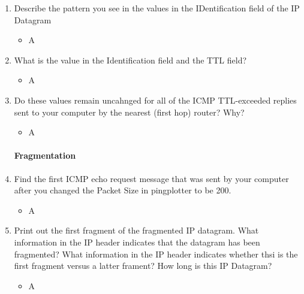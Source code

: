 \documentclass{article}
\begin{document}
\begin{enumerate}
      \item Describe the pattern you see in the values in the IDentification field of the IP Datagram 
          \begin{itemize}
            \item A
          \end{itemize}


      \item What is the value in the Identification field and the TTL field? 
          \begin{itemize}
            \item A
          \end{itemize}

      \item Do these values remain uncahnged for all of the ICMP TTL-exceeded replies sent to your computer by the nearest (first hop) router? Why? 
          \begin{itemize}
            \item A
          \end{itemize}

      \paragraph{Fragmentation}
      \item Find the first ICMP echo request message that was sent by your computer after you changed the Packet Size in pingplotter to be 200.
          \begin{itemize}
            \item A
          \end{itemize}

      \item Print out the first fragment of the fragmented IP datagram.  What information in the IP header indicates that the datagram has been fragmented?  What information in the IP header indicates whether thsi is the first fragment
      versus a latter frament?  How long is this IP Datagram?
          \begin{itemize}
            \item A

    \end{itemize}
  \end{enumerate}
\end{document}
